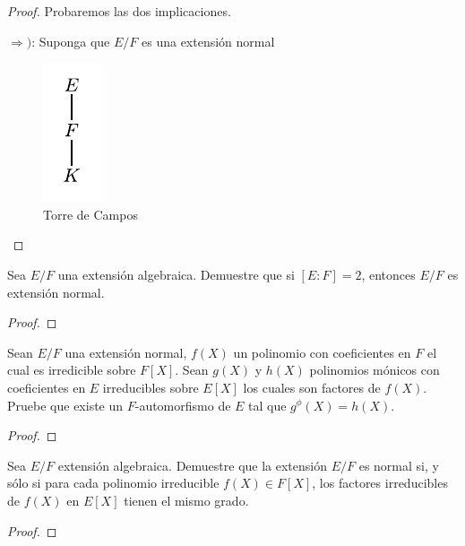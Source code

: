 \documentclass[12pt]{report}
\theoremstyle{largebreak}
\begin{document}
\begin{proof}
    Probaremos las dos implicaciones.

    $\Rightarrow)$: Suponga que $E/F$ es una extensión normal 

    \begin{figure}
        \begin{center}
            \includegraphics[scale=2.5]{Figures/torre_de_campos.pdf}
        \end{center}
        \caption{Torre de Campos}
    \end{figure}

    \lipsum
\end{proof}

\begin{excer}
    Sea $E/F$ una extensión algebraica. Demuestre que si $[E:F]=2$, entonces $E/F$ es extensión normal.
\end{excer}

\begin{proof}
    
\end{proof}

\begin{excer}
    Sean $E/F$ una extensión normal, $f(X)$ un polinomio con coeficientes en $F$ el cual es irredicible sobre $F[X]$. Sean $g(X)$ y $h(X)$ polinomios mónicos con coeficientes en $E$ irreducibles sobre $E[X]$ los cuales son factores de $f(X)$. Pruebe que existe un $F$-automorfismo de $E$ tal que $g^\phi(X)=h(X)$.
\end{excer}

\begin{proof}
    
\end{proof}

\begin{excer}
    Sea $E/F$ extensión algebraica. Demuestre que la extensión $E/F$ es normal si, y sólo si para cada polinomio irreducible $f(X)\in F[X]$, los factores irreducibles de $f(X)$ en $E[X]$ tienen el mismo grado.
\end{excer}

\begin{proof}
    
\end{proof}
\end{document}
